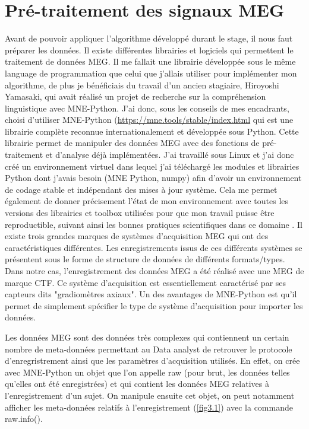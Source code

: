 \chapter{Pré-traitement des signaux MEG}

Avant de pouvoir appliquer l'algorithme développé durant le stage, il nous faut préparer les données.
Il existe différentes librairies et logiciels qui permettent le traitement de données MEG. Il me fallait une librairie développée sous le même language de programmation que celui que j'allais utiliser pour implémenter mon algorithme, de plus je bénéficiais du travail d'un ancien stagiaire, Hiroyoshi Yamasaki, qui avait réalisé un projet de recherche sur la compréhension linguistique avec MNE-Python. J'ai donc, sous les conseils de mes encadrants, choisi d'utiliser MNE-Python (\href{https://mne.tools/stable/index.html}{https://mne.tools/stable/index.html} \cite{17} qui est une librairie complète reconnue internationalement et développée sous Python. Cette librairie permet de manipuler des données MEG avec des fonctions de pré-traitement et d'analyse déjà implémentées. J'ai travaillé sous Linux et j'ai donc créé un environnement virtuel dans lequel j'ai téléchargé les modules et librairies Python dont j'avais besoin (MNE Python, numpy) afin d'avoir un environnement de codage stable et indépendant des mises à jour système. Cela me permet également de donner précisement l'état de mon environnement avec toutes les versions des librairies et toolbox utilisées pour que mon travail puisse être reproductible, suivant ainsi les bonnes pratiques scientifiques dans ce domaine \cite{13}.
Il existe trois grandes marques de systèmes d'acquisition MEG qui ont des caractéristiques différentes. Les enregistrements issus de ces différents systèmes se présentent sous le forme de structure de données de différents formats/types. Dans notre cas, l'enregistrement des données MEG a été réalisé avec une MEG de marque CTF. Ce système d'acquisition est essentiellement caractérisé par ses capteurs dits "gradiomètres axiaux". Un des avantages de MNE-Python est qu'il permet de simplement spécifier le type de système d'acquisition pour importer les données.

\vspace{2ex}
Les données MEG sont des données très complexes qui contiennent un certain nombre de meta-données permettant au Data analyst de retrouver le protocole d'enregristrement ainsi que les paramètres d'acquisition utilisés. En effet, on crée avec MNE-Python un objet que l'on appelle raw (pour brut, les données telles qu'elles ont été enregistrées) et qui contient les données MEG relatives à l'enregistrement d'un sujet. On manipule ensuite cet objet, on peut notamment afficher les meta-données relatifs à l'enregistrement (\ref{fig3.1}) avec la commande raw.info().


